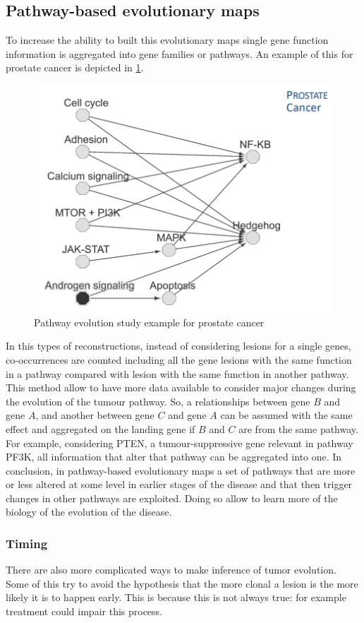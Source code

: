   \subsection{Pathway-based evolutionary maps}
  To increase the ability to built this evolutionary maps single gene function information is aggregated into gene families or pathways.
  An example of this for prostate cancer is depicted in \ref{fig:prostate_path}.

  \begin{figure}[H]
    \centering
    \includegraphics[width=0.4\linewidth]{pathways.png}
    \caption{Pathway evolution study example for prostate cancer}
    \label{fig:prostate_path}
  \end{figure}

  In this types of reconstructions, instead of considering lesions for a single genes, co-occurrences are counted including all the gene lesions with the same function in a pathway compared with lesion with the same function in another pathway.
  This method allow to have more data available to consider major changes during the evolution of the tumour pathway.
  So, a relationships between gene $B$ and gene $A$, and another between gene $C$ and gene $A$ can be assumed with the same effect and aggregated on the landing gene if $B$ and $C$ are from the same pathway.
  For example, considering PTEN, a tumour-suppressive gene relevant in pathway PF3K, all information that alter that pathway can be aggregated into one.
  In conclusion, in pathway-based evolutionary maps a set of pathways that are more or less altered at some level in earlier stages of the disease and that then trigger changes in other pathways are exploited.
  Doing so allow to learn more of the biology of the evolution of the disease.

    \subsubsection{Timing}
    There are also more complicated ways to make inference of tumor evolution.
    Some of this try to avoid the hypothesis that the more clonal a lesion is the more likely it is to happen early.
    This is because this is not always true: for example treatment could impair this process.

